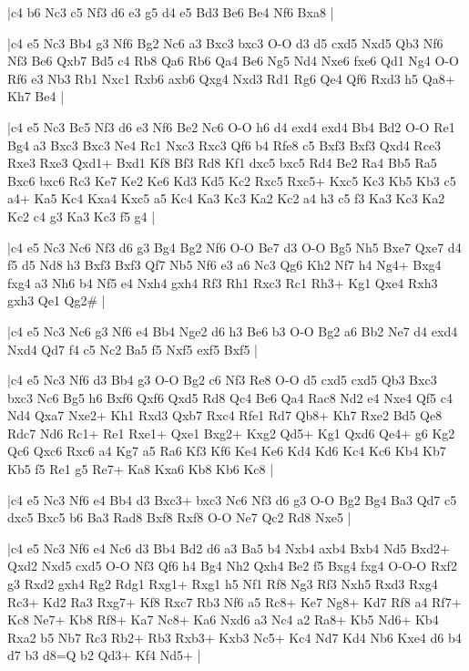 \whitename{}
\blackname{}
\makegametitle
|c4 b6 Nc3 c5 Nf3 d6 e3 g5 d4 e5 Bd3 Be6 Be4 Nf6 Bxa8  |

\whitename{}
\blackname{}
\makegametitle
|c4 e5 Nc3 Bb4 g3 Nf6 Bg2 Nc6 a3 Bxc3 bxc3 O-O d3 d5 cxd5 Nxd5 Qb3 Nf6 Nf3 Be6 Qxb7 Bd5 c4 Rb8 Qa6 Rb6 Qa4 Be6 Ng5 Nd4 Nxe6 fxe6 Qd1 Ng4 O-O Rf6 e3 Nb3 Rb1 Nxc1 Rxb6 axb6 Qxg4 Nxd3 Rd1 Rg6 Qe4 Qf6 Rxd3 h5 Qa8+ Kh7 Be4  |

\whitename{}
\blackname{}
\makegametitle
|c4 e5 Nc3 Bc5 Nf3 d6 e3 Nf6 Be2 Nc6 O-O h6 d4 exd4 exd4 Bb4 Bd2 O-O Re1 Bg4 a3 Bxc3 Bxc3 Ne4 Rc1 Nxc3 Rxc3 Qf6 b4 Rfe8 c5 Bxf3 Bxf3 Qxd4 Rce3 Rxe3 Rxe3 Qxd1+ Bxd1 Kf8 Bf3 Rd8 Kf1 dxc5 bxc5 Rd4 Be2 Ra4 Bb5 Ra5 Bxc6 bxc6 Rc3 Ke7 Ke2 Ke6 Kd3 Kd5 Kc2 Rxc5 Rxc5+ Kxc5 Kc3 Kb5 Kb3 c5 a4+ Ka5 Kc4 Kxa4 Kxc5 a5 Kc4 Ka3 Kc3 Ka2 Kc2 a4 h3 c5 f3 Ka3 Kc3 Ka2 Kc2 c4 g3 Ka3 Kc3 f5 g4  |

\whitename{}
\blackname{}
\makegametitle
|c4 e5 Nc3 Nc6 Nf3 d6 g3 Bg4 Bg2 Nf6 O-O Be7 d3 O-O Bg5 Nh5 Bxe7 Qxe7 d4 f5 d5 Nd8 h3 Bxf3 Bxf3 Qf7 Nb5 Nf6 e3 a6 Nc3 Qg6 Kh2 Nf7 h4 Ng4+ Bxg4 fxg4 a3 Nh6 b4 Nf5 e4 Nxh4 gxh4 Rf3 Rh1 Rxc3 Rc1 Rh3+ Kg1 Qxe4 Rxh3 gxh3 Qe1 Qg2\#  |

\whitename{}
\blackname{}
\makegametitle
|c4 e5 Nc3 Nc6 g3 Nf6 e4 Bb4 Nge2 d6 h3 Be6 b3 O-O Bg2 a6 Bb2 Ne7 d4 exd4 Nxd4 Qd7 f4 c5 Nc2 Ba5 f5 Nxf5 exf5 Bxf5  |

\whitename{}
\blackname{}
\makegametitle
|c4 e5 Nc3 Nf6 d3 Bb4 g3 O-O Bg2 c6 Nf3 Re8 O-O d5 cxd5 cxd5 Qb3 Bxc3 bxc3 Nc6 Bg5 h6 Bxf6 Qxf6 Qxd5 Rd8 Qc4 Be6 Qa4 Rac8 Nd2 e4 Nxe4 Qf5 c4 Nd4 Qxa7 Nxe2+ Kh1 Rxd3 Qxb7 Rxc4 Rfe1 Rd7 Qb8+ Kh7 Rxe2 Bd5 Qe8 Rdc7 Nd6 Rc1+ Re1 Rxe1+ Qxe1 Bxg2+ Kxg2 Qd5+ Kg1 Qxd6 Qe4+ g6 Kg2 Qc6 Qxc6 Rxc6 a4 Kg7 a5 Ra6 Kf3 Kf6 Ke4 Ke6 Kd4 Kd6 Kc4 Kc6 Kb4 Kb7 Kb5 f5 Re1 g5 Re7+ Ka8 Kxa6 Kb8 Kb6 Kc8  |

\whitename{}
\blackname{}
\makegametitle
|c4 e5 Nc3 Nf6 e4 Bb4 d3 Bxc3+ bxc3 Nc6 Nf3 d6 g3 O-O Bg2 Bg4 Ba3 Qd7 c5 dxc5 Bxc5 b6 Ba3 Rad8 Bxf8 Rxf8 O-O Ne7 Qc2 Rd8 Nxe5  |

\whitename{}
\blackname{}
\makegametitle
|c4 e5 Nc3 Nf6 e4 Nc6 d3 Bb4 Bd2 d6 a3 Ba5 b4 Nxb4 axb4 Bxb4 Nd5 Bxd2+ Qxd2 Nxd5 cxd5 O-O Nf3 Qf6 h4 Bg4 Nh2 Qxh4 Be2 f5 Bxg4 fxg4 O-O-O Rxf2 g3 Rxd2 gxh4 Rg2 Rdg1 Rxg1+ Rxg1 h5 Nf1 Rf8 Ng3 Rf3 Nxh5 Rxd3 Rxg4 Rc3+ Kd2 Ra3 Rxg7+ Kf8 Rxc7 Rb3 Nf6 a5 Rc8+ Ke7 Ng8+ Kd7 Rf8 a4 Rf7+ Kc8 Ne7+ Kb8 Rf8+ Ka7 Nc8+ Ka6 Nxd6 a3 Nc4 a2 Ra8+ Kb5 Nd6+ Kb4 Rxa2 b5 Nb7 Rc3 Rb2+ Rb3 Rxb3+ Kxb3 Nc5+ Kc4 Nd7 Kd4 Nb6 Kxe4 d6 b4 d7 b3 d8=Q b2 Qd3+ Kf4 Nd5+  |


